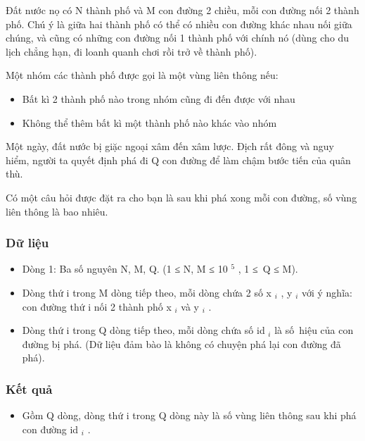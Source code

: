 



   Đất nước nọ có N thành phố và M con đường 2 chiều, mỗi con đường nối 2 thành phố. Chú ý là giữa hai thành phố có thể có nhiều con đường khác nhau nối giữa chúng, và cũng có những con đường nối 1 thành phố với chính nó (dùng cho du lịch chẳng hạn, đi loanh quanh chơi rồi trở về thành phố).  

   Một nhóm các thành phố được gọi là một vùng liên thông nếu:  
\begin{itemize}
	\item     Bất kì 2 thành phố nào trong nhóm cũng đi đến được với nhau   
	\item     Không thể thêm bất kì một thành phố nào khác vào nhóm   
\end{itemize}

   Một ngày, đất nước bị giặc ngoại xâm đến xâm lược. Địch rất đông và nguy hiểm, người ta quyết định phá đi Q con đường để làm chậm bước tiến của quân thù.  

   Có một câu hỏi được đặt ra cho bạn là sau khi phá xong mỗi con đường, số vùng liên thông là bao nhiêu.  

\subsubsection{   Dữ liệu  }
\begin{itemize}
	\item     Dòng 1: Ba số nguyên N, M, Q. (1 ≤ N, M ≤ 10    $^     5    $    , 1 ≤ Q ≤ M).   
	\item     Dòng thứ i trong M dòng tiếp theo, mỗi dòng chứa 2 số x    $_     i    $    , y    $_     i    $    với ý nghĩa: con đường thứ i nối 2 thành phố x    $_     i    $    và y    $_     i    $    .   
	\item     Dòng thứ i trong Q dòng tiếp theo, mỗi dòng chứa số id    $_     i    $    là số hiệu của con đường bị phá. (Dữ liệu đảm bào là không có chuyện phá lại con đường đã phá).   
\end{itemize}

\subsubsection{   Kết quả  }
\begin{itemize}
	\item     Gồm Q dòng, dòng thứ i trong Q dòng này là số vùng liên thông sau khi phá con đường id    $_     i    $    .   
\end{itemize}

